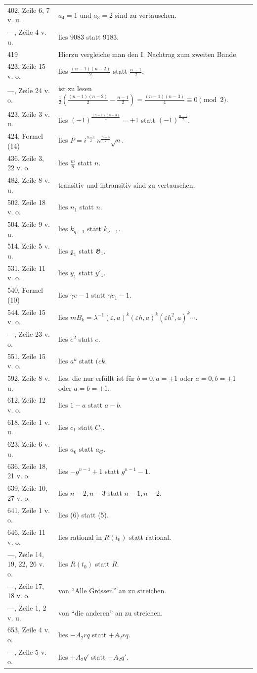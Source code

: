 \documentclass[11pt]{article}
\begin{document}
\begin{longtable}{p{}p{}}
402, Zeile 6, 7 v. u. & $a_4=1$ und $a_3=2$ sind zu vertauschen.\\
---, Zeile 4 v. u. & lies $9083$ statt $9183$.\\
419 & Hierzu vergleiche man den I. Nachtrag zum zweiten Bande.\\
423, Zeile 15 v. o. & lies $\frac{(n-1)(n-2)}{2}$ statt $\frac{n-1}{2}$.\\
---, Zeile 24 v. o. & ist zu lesen $\frac12\left(\frac{(n-1)(n-2)}{2}-\frac{n-1}{2}\right)=\frac{(n-1)(n-3)}{4}\equiv0\pmod2$.\\
423, Zeile 3 v. u. & lies $(-1)^{\frac{(n-1)(n-3)}{4}}=+1$ statt $(-1)^{\frac{n-1}{2}}$.\\
424, Formel (14) & lies $P=i^{\frac{n-1}{2}}\,n^{\frac{n-3}{2}}\sqrt n$.\\
436, Zeile 3, 22 v. o. & lies $\frac{m}{n}$ statt $n$.\\
482, Zeile 8 v. u. & transitiv und intransitiv sind zu vertauschen.\\
502, Zeile 18 v. o. & lies $n_1$ statt $n$.\\
504, Zeile 9 v. u. & lies $k_{q-1}$ statt $k_{\nu-1}$.\\
514, Zeile 5 v. u. & lies $\mathfrak g_1$ statt $\mathfrak G_1$.\\
531, Zeile 11 v. o. & lies $y_1$ statt $y'_1$.\\
540, Formel (10) & lies $\gamma e-1$ statt $\gamma e_1-1$.\\
544, Zeile 15 v. o. & lies $mB_k=\lambda^{-1}(\varepsilon,a)^k(\varepsilon h,a)^k(\varepsilon h^2,a)^k\cdots$.\\
---, Zeile 23 v. o. & lies $e^2$ statt $e$.\\
551, Zeile 15 v. o. & lies $a^k$ statt $(ck$.\\
592, Zeile 8 v. u. & lies: die nur erfüllt ist für $b=0,a=\pm1$ oder $a=0,b=\pm1$ oder $a=b=\pm1$.\\
612, Zeile 12 v. o. & lies $1-a$ statt $a-b$.\\
618, Zeile 1 v. u. & lies $c_1$ statt $C_1$.\\
623, Zeile 6 v. u. & lies $a_6$ statt $a_G$.\\
636, Zeile 18, 21 v. o. & lies $-g^{n-1}+1$ statt $g^{n-1}-1$.\\
639, Zeile 10, 27 v. o. & lies $n-2,n-3$ statt $n-1,n-2$.\\
641, Zeile 1 v. o. & lies (6) statt (5).\\
646, Zeile 11 v. o. & lies rational in $R(t_0)$ statt rational.\\
---, Zeile 14, 19, 22, 26 v. o. & lies $R(t_0)$ statt $R$.\\
---, Zeile 17, 18 v. o. & von ``Alle Grössen'' an zu streichen.\\
---, Zeile 1, 2 v. u. & von ``die anderen'' an zu streichen.\\
653, Zeile 4 v. o. & lies $-A_2rq$ statt $+A_2rq$.\\
---, Zeile 5 v. o. & lies $+A_2q'$ statt $-A_2q'$.\\
\end{longtable}
\end{document}
